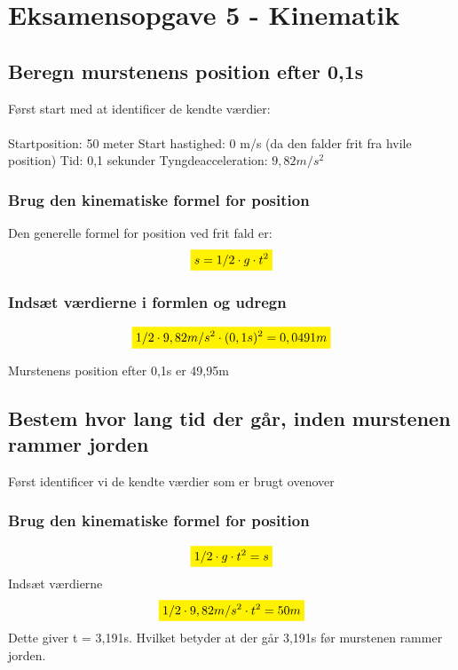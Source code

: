 \section{Eksamensopgave 5 - Kinematik}
\subsection{Beregn murstenens position efter 0,1s}
Først start med at identificer de kendte værdier:
\\\\
Startposition: 50 meter \newline
Start hastighed: 0 m/s (da den falder frit fra hvile position)\newline
Tid: 0,1 sekunder \newline
Tyngdeacceleration: \begin{math}9,82m/s^{2}\end{math}


\subsubsection{Brug den kinematiske formel for position}
Den generelle formel for position ved frit fald er:
\begin{equation*}
    \mathcolorbox{yellow}{s=1/2 \cdot g \cdot t^{2}}
\end{equation*}

\subsubsection{Indsæt værdierne i formlen og udregn}
\begin{equation*}
    \mathcolorbox{yellow}{1/2 \cdot 9,82m/s^{2} \cdot (0,1s)^{2}=0,0491m}
\end{equation*}

Murstenens position efter 0,1s er 49,95m

\subsection{Bestem hvor lang tid der går, inden murstenen rammer jorden}

Først identificer vi de kendte værdier som er brugt ovenover

\subsubsection{Brug den kinematiske formel for position}
\begin{equation*}
    \mathcolorbox{yellow}{1/2\cdot g\cdot t^{2}=s}
\end{equation*}
Indsæt værdierne
\begin{equation*}
    \mathcolorbox{yellow}{1/2\cdot9,82m/s^{2}\cdot t^{2}=50m}
\end{equation*}
Dette giver t = 3,191s. Hvilket betyder at der går 3,191s før murstenen rammer jorden.

